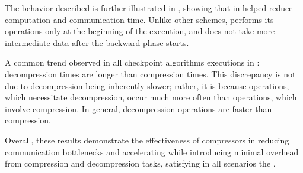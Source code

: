 \documentclass[Ingles]{ic-tese-v3}
\begin{document}
The \uniform behavior described is further illustrated in , showing that \compression in \uniform helped reduce computation and communication time. Unlike other \checkpointing schemes, \uniform performs its \save operations only at the beginning of the execution, and does not take more intermediate data after the backward phase starts.

A common trend observed in all checkpoint algorithms executions in : decompression times are longer than compression times. This discrepancy is not due to decompression being inherently slower; rather, it is because \restore operations, which necessitate decompression, occur much more often than \save operations, which involve compression. In general, decompression operations are faster than compression.

Overall, these results demonstrate the effectiveness of compressors in reducing communication bottlenecks and accelerating \awave while introducing minimal overhead from compression and decompression tasks, satisfying in all scenarios the .
\end{document}
